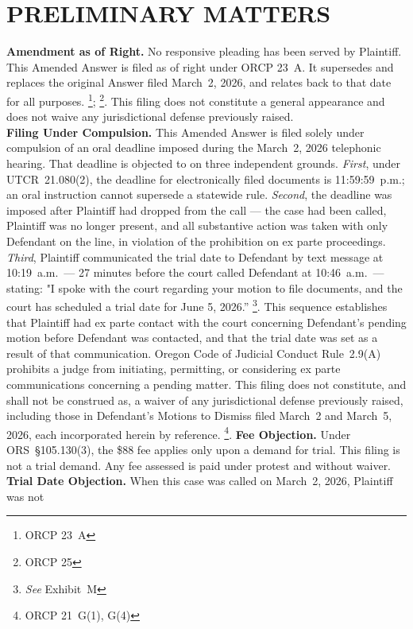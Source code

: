 \documentclass[10pt,letterpaper,oneside]{extarticle}
\begin{document}
\section{\textbf{PRELIMINARY MATTERS}}
\textbf{Amendment as of Right.}
No responsive pleading has been served by Plaintiff. This
Amended Answer is filed as of right under ORCP 23~A. It
supersedes and replaces the original Answer filed March~2,
2026, and relates back to that date for all purposes.
\footnote{ORCP 23~A}; \footnote{ORCP 25}. This filing does not constitute a general
appearance and does not waive any jurisdictional defense
previously raised.\\
\textbf{Filing Under Compulsion.}
This Amended Answer is filed solely under compulsion of an
oral deadline imposed during the March~2, 2026 telephonic
hearing. That deadline is objected to on three independent
grounds. \textit{First}, under UTCR~21.080(2), the deadline
for electronically filed documents is 11:59:59~p.m.; an oral
instruction cannot supersede a statewide rule.
\textit{Second}, the deadline was imposed after Plaintiff had
dropped from the call --- the case had been called, Plaintiff
was no longer present, and all substantive action was taken
with only Defendant on the line, in violation of the
prohibition on ex parte proceedings. \textit{Third},
Plaintiff communicated the trial date to Defendant by text
message at 10:19~a.m.\ --- 27 minutes before the court
called Defendant at 10:46~a.m.\ --- stating: "I spoke with
the court regarding your motion to file documents, and the
court has scheduled a trial date for June 5, 2026.''
\footnote{\textit{See} Exhibit~M}. This sequence establishes that
Plaintiff had ex parte contact with the court concerning
Defendant's pending motion before Defendant was contacted,
and that the trial date was set as a result of that
communication. Oregon Code of Judicial Conduct Rule~2.9(A)
prohibits a judge from initiating, permitting, or considering
ex parte communications concerning a pending matter. This
filing does not constitute, and shall not be construed as,
a waiver of any jurisdictional defense previously raised,
including those in Defendant's Motions to Dismiss filed
March~2 and March~5, 2026, each incorporated herein by
reference. \footnote{ORCP 21~G(1), G(4)}.
\textbf{Fee Objection.}
Under ORS~\S105.130(3), the \$88 fee applies only upon a
demand for trial. This filing is not a trial demand. Any fee
assessed is paid under protest and without waiver.
\textbf{Trial Date Objection.}
When this case was called on March~2, 2026, Plaintiff was not
\end{document}
